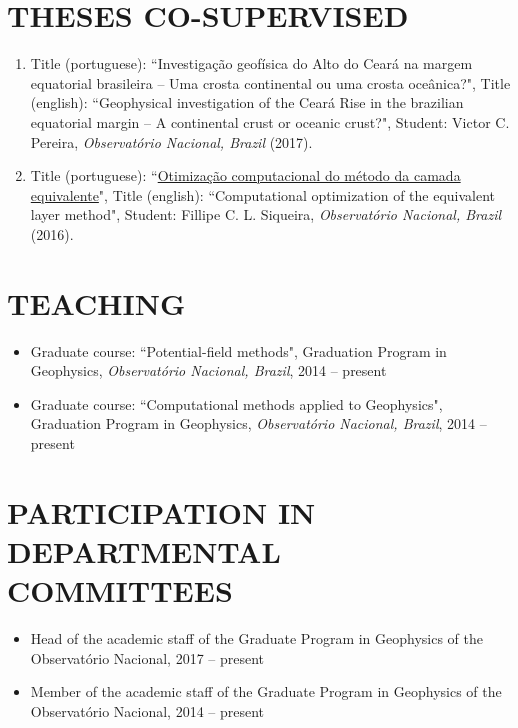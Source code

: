 \documentclass[paper=letter,fontsize=11pt]{scrartcl} %
\newcommand{\sepspace}{\vspace*{1em}}		%
\newcommand{\NewPart}[2]{\section*{\uppercase{#1} #2}}
\newcommand{\ThesisEntry}[6]{
		\noindent [#1] Title (portuguese): ``#2", Title (english): ``#3", Student: #4, \textit{#5} (#6).}
\newcommand{\CourseEntry}[5]{
		\noindent #1 course: ``#2", #3, \textit{#4}, #5}
\begin{document}
\sepspace

\NewPart{Theses Co-supervised}{}

\begin{enumerate}

\item\ThesisEntry{MSc}{Investiga\c{c}\~{a}o geof\'{i}sica do Alto do Cear\'{a} na margem equatorial brasileira -- Uma crosta continental ou uma crosta oce\^{a}nica?}{Geophysical investigation of the Cear\'{a} Rise in the brazilian equatorial margin -- A continental crust or oceanic crust?}{Victor C. Pereira}{Observat\'{o}rio Nacional, Brazil}{2017}

\item\ThesisEntry{PhD}{\href{http://www.pinga-lab.org/thesis/siqueira-phd.html}{Otimiza\c{c}\~{a}o computacional do m\'{e}todo da camada equivalente}}{Computational optimization of the equivalent layer method}{Fillipe C. L. Siqueira}{Observat\'{o}rio Nacional, Brazil}{2016}

\end{enumerate}

\sepspace

\NewPart{Teaching}{}

\begin{itemize}

\item\CourseEntry{Graduate}{Potential-field methods}{Graduation Program in Geophysics}{Observat\'{o}rio Nacional, Brazil}{2014 -- present}

\item\CourseEntry{Graduate}{Computational methods applied to Geophysics}{Graduation Program in Geophysics}{Observat\'{o}rio Nacional, Brazil}{2014 -- present}

\end{itemize}

\sepspace

\NewPart{Participation in departmental committees}{}

\begin{itemize}

\item Head of the academic staff of the Graduate Program in Geophysics of the 
Observat\'{o}rio Nacional, 2017 -- present

\item Member of the academic staff of the Graduate Program in Geophysics of the 
Observat\'{o}rio Nacional, 2014 -- present

\end{itemize}
\end{document}
